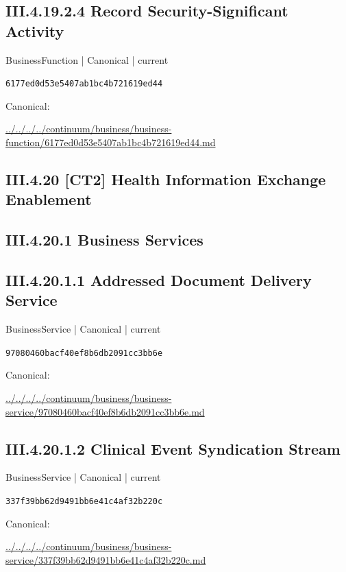 \documentclass[10pt,a4paper]{article}
\begin{document}
\subsection*{III.4.19.2.4 Record Security-Significant Activity}
{\small BusinessFunction | Canonical | current}\par
\texttt{6177ed0d53e5407ab1bc4b721619ed44}\par
Canonical: \par
{\footnotesize\url{../../../../continuum/business/business-function/6177ed0d53e5407ab1bc4b721619ed44.md}}\par
\subsection*{III.4.20 [CT2] Health Information Exchange Enablement}
\subsection*{III.4.20.1 Business Services}
\subsection*{III.4.20.1.1 Addressed Document Delivery Service}
{\small BusinessService | Canonical | current}\par
\texttt{97080460bacf40ef8b6db2091cc3bb6e}\par
Canonical: \par
{\footnotesize\url{../../../../continuum/business/business-service/97080460bacf40ef8b6db2091cc3bb6e.md}}\par
\subsection*{III.4.20.1.2 Clinical Event Syndication Stream}
{\small BusinessService | Canonical | current}\par
\texttt{337f39bb62d9491bb6e41c4af32b220c}\par
Canonical: \par
{\footnotesize\url{../../../../continuum/business/business-service/337f39bb62d9491bb6e41c4af32b220c.md}}\par
\end{document}
